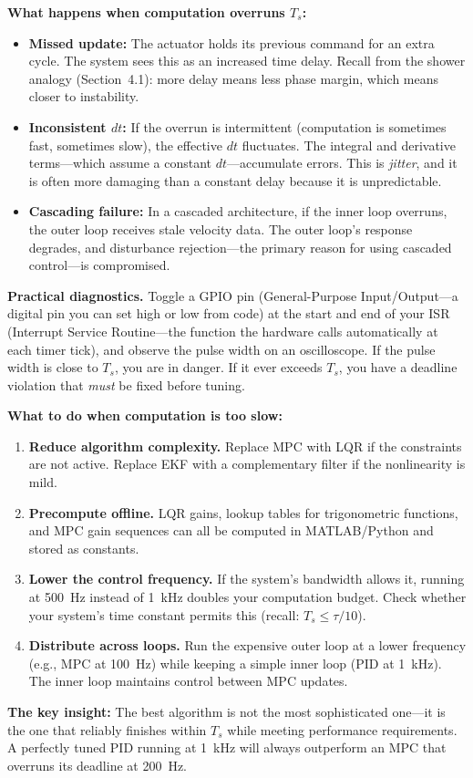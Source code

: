 \begin{mdframed}[linewidth=1pt, innertopmargin=10pt, innerbottommargin=10pt]
\textbf{What happens when computation overruns $T_s$:}
\begin{itemize}[nosep]
    \item \textbf{Missed update:} The actuator holds its previous command for an extra cycle. The system sees this as an increased time delay. Recall from the shower analogy (Section~4.1): more delay means less phase margin, which means closer to instability.
    \item \textbf{Inconsistent $dt$:} If the overrun is intermittent (computation is sometimes fast, sometimes slow), the effective $dt$ fluctuates. The integral and derivative terms---which assume a constant $dt$---accumulate errors. This is \textit{jitter}, and it is often more damaging than a constant delay because it is unpredictable.
    \item \textbf{Cascading failure:} In a cascaded architecture, if the inner loop overruns, the outer loop receives stale velocity data. The outer loop's response degrades, and disturbance rejection---the primary reason for using cascaded control---is compromised.
\end{itemize}

\textbf{Practical diagnostics.} Toggle a GPIO pin (General-Purpose Input/Output---a digital pin you can set high or low from code) at the start and end of your ISR (Interrupt Service Routine---the function the hardware calls automatically at each timer tick), and observe the pulse width on an oscilloscope. If the pulse width is close to $T_s$, you are in danger. If it ever exceeds $T_s$, you have a deadline violation that \textit{must} be fixed before tuning.

\textbf{What to do when computation is too slow:}
\begin{enumerate}[nosep]
    \item \textbf{Reduce algorithm complexity.} Replace MPC with LQR if the constraints are not active. Replace EKF with a complementary filter if the nonlinearity is mild.
    \item \textbf{Precompute offline.} LQR gains, lookup tables for trigonometric functions, and MPC gain sequences can all be computed in MATLAB/Python and stored as constants.
    \item \textbf{Lower the control frequency.} If the system's bandwidth allows it, running at 500~Hz instead of 1~kHz doubles your computation budget. Check whether your system's time constant permits this (recall: $T_s \leq \tau / 10$).
    \item \textbf{Distribute across loops.} Run the expensive outer loop at a lower frequency (e.g., MPC at 100~Hz) while keeping a simple inner loop (PID at 1~kHz). The inner loop maintains control between MPC updates.
\end{enumerate}

\textbf{The key insight:} The best algorithm is not the most sophisticated one---it is the one that reliably finishes within $T_s$ while meeting performance requirements. A perfectly tuned PID running at 1~kHz will always outperform an MPC that overruns its deadline at 200~Hz.
\end{mdframed}

